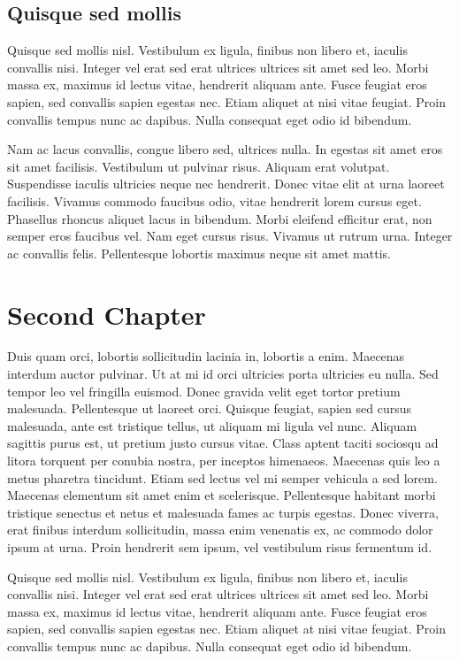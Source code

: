 \documentclass[a4paper,10pt]{book}
\begin{document}
\section{Quisque sed mollis}

Quisque sed mollis nisl. Vestibulum ex ligula, finibus non libero et, iaculis convallis nisi.
Integer vel erat sed erat ultrices ultrices sit amet sed leo. Morbi massa ex, maximus id lectus vitae,
hendrerit aliquam ante. Fusce feugiat eros sapien, sed convallis sapien egestas nec. Etiam aliquet at
nisi vitae feugiat. Proin convallis tempus nunc ac dapibus. Nulla consequat eget odio id bibendum.

Nam ac lacus convallis, congue libero sed, ultrices nulla. In egestas sit amet eros sit amet facilisis.
Vestibulum ut pulvinar risus. Aliquam erat volutpat. Suspendisse iaculis ultricies neque nec hendrerit.
Donec vitae elit at urna laoreet facilisis. Vivamus commodo faucibus odio, vitae hendrerit lorem cursus eget.
Phasellus rhoncus aliquet lacus in bibendum. Morbi eleifend efficitur erat, non semper eros faucibus vel.
Nam eget cursus risus. Vivamus ut rutrum urna. Integer ac convallis felis.
Pellentesque lobortis maximus neque sit amet mattis.

\chapter{Second Chapter}

Duis quam orci, lobortis sollicitudin lacinia in, lobortis a enim. Maecenas interdum auctor pulvinar.
Ut at mi id orci ultricies porta ultricies eu nulla. Sed tempor leo vel fringilla euismod. Donec gravida velit
eget tortor pretium malesuada. Pellentesque ut laoreet orci. Quisque feugiat, sapien sed cursus malesuada,
ante est tristique tellus, ut aliquam mi ligula vel nunc. Aliquam sagittis purus est, ut pretium justo cursus vitae.
Class aptent taciti sociosqu ad litora torquent per conubia nostra, per inceptos himenaeos.
Maecenas quis leo a metus pharetra tincidunt. Etiam sed lectus vel mi semper vehicula a sed lorem.
Maecenas elementum sit amet enim et scelerisque.
Pellentesque habitant morbi tristique senectus et netus et malesuada fames ac turpis egestas.
Donec viverra, erat finibus interdum sollicitudin, massa enim venenatis ex, ac commodo dolor ipsum at urna.
Proin hendrerit sem ipsum, vel vestibulum risus fermentum id.

Quisque sed mollis nisl. Vestibulum ex ligula, finibus non libero et, iaculis convallis nisi.
Integer vel erat sed erat ultrices ultrices sit amet sed leo. Morbi massa ex, maximus id lectus vitae,
hendrerit aliquam ante. Fusce feugiat eros sapien, sed convallis sapien egestas nec. Etiam aliquet at
nisi vitae feugiat. Proin convallis tempus nunc ac dapibus. Nulla consequat eget odio id bibendum.
\end{document}
